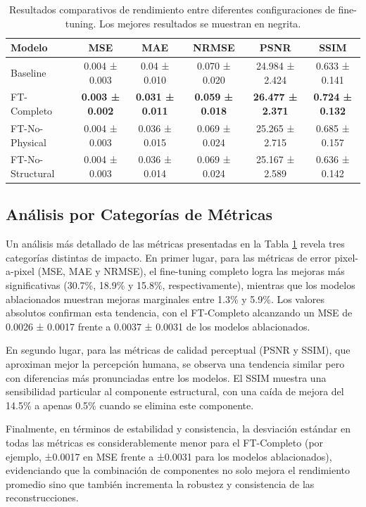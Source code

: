 \begin{table}[htbp]
    \centering
    \begin{tabular}{lccccc}
    \hline
    \textbf{Modelo} & \textbf{MSE} & \textbf{MAE} & \textbf{NRMSE} & \textbf{PSNR} & \textbf{SSIM} \\
    \hline
    Baseline & 0.004 ± 0.003 & 0.04 ± 0.010 & 0.070 ± 0.020 & 24.984 ± 2.424 & 0.633 ± 0.141 \\
    \hline
    FT-Completo & \textbf{0.003 ± 0.002} & \textbf{0.031 ± 0.011} & \textbf{0.059 ± 0.018} & \textbf{26.477 ± 2.371} & \textbf{0.724 ± 0.132} \\
    \hline
    FT-No-Physical & 0.004 ± 0.003 & 0.036 ± 0.015 & 0.069 ± 0.024 & 25.265 ± 2.715 & 0.685 ± 0.157 \\
    \hline
    FT-No-Structural & 0.004 ± 0.003 & 0.036 ± 0.014 & 0.069 ± 0.024 & 25.167 ± 2.589 & 0.636 ± 0.142 \\
    \hline
    \end{tabular}
    \caption{Resultados comparativos de rendimiento entre diferentes configuraciones de fine-tuning. Los mejores resultados se muestran en negrita.}
    \label{tab:metrics_comparative}
\end{table}

\subsection{Análisis por Categorías de Métricas}

Un análisis más detallado de las métricas presentadas en la Tabla \ref{tab:metrics_comparative} revela tres categorías distintas de impacto. En primer lugar, para las métricas de error pixel-a-pixel (MSE, MAE y NRMSE), el fine-tuning completo logra las mejoras más significativas (30.7\%, 18.9\% y 15.8\%, respectivamente), mientras que los modelos ablacionados muestran mejoras marginales entre 1.3\% y 5.9\%. Los valores absolutos confirman esta tendencia, con el FT-Completo alcanzando un MSE de 0.0026 ± 0.0017 frente a 0.0037 ± 0.0031 de los modelos ablacionados.

En segundo lugar, para las métricas de calidad perceptual (PSNR y SSIM), que aproximan mejor la percepción humana, se observa una tendencia similar pero con diferencias más pronunciadas entre los modelos. El SSIM muestra una sensibilidad particular al componente estructural, con una caída de mejora del 14.5\% a apenas 0.5\% cuando se elimina este componente.

Finalmente, en términos de estabilidad y consistencia, la desviación estándar en todas las métricas es considerablemente menor para el FT-Completo (por ejemplo, ±0.0017 en MSE frente a ±0.0031 para los modelos ablacionados), evidenciando que la combinación de componentes no solo mejora el rendimiento promedio sino que también incrementa la robustez y consistencia de las reconstrucciones.

